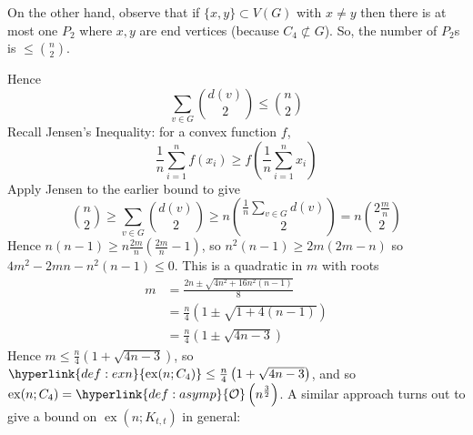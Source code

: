 \documentclass{article}
\DeclareMathOperator{\ext}{ex}
\begin{document}
\begin{eg}
    On the other hand, observe that if $\{x, y\} \subset V(G)$ with $x \neq y$ then there is at most one $P_2$ where $x, y$ are end vertices (because $C_4 \not\subset G$). So, the number of $P_2$s is $\leq \binom{n}{2}$.
    \begin{center}
    \end{center}
    Hence \begin{equation*}\sum_{v \in G} \binom{d(v)}{2} \leq \binom{n}{2}\end{equation*}
    Recall Jensen's Inequality: for a convex function $f$,
    \begin{equation*}
        \frac{1}{n} \sum_{i=1}^n f(x_i) \geq f\left(\frac{1}{n} \sum_{i=1}^n x_i\right)
    \end{equation*}
    Apply Jensen to the earlier bound to give
    \begin{equation*}
        \binom{n}{2} \geq \sum_{v \in G} \binom{d(v)}{2} \geq n \binom{\frac{1}{n} \sum_{v \in G} d(v)}{2} = n \binom{2 \frac{m}{n}}{2}
    \end{equation*}
    Hence $n(n-1) \geq n \frac{2m}{n} (\frac{2m}{n} - 1)$, so $n^2 (n-1) \geq 2m (2m-n)$ so $4m^2 - 2mn - n^2 (n-1) \leq 0$.
    This is a quadratic in $m$ with roots
    \begin{align*}
        m &= \frac{2n \pm \sqrt{4 n^2 + 16 n^2(n-1)}}{8} \\
        &= \frac{n}{4}(1 \pm \sqrt{1 + 4\left(n-1\right)}) \\
        &= \frac{n}{4}\left(1 \pm \sqrt{4n - 3}\right)
    \end{align*}
    Hence $m \leq \frac{n}{4}\left(1 + \sqrt{4n-3}\right)$, so $\hyperlink{def:exn}{\ext(n; C_4)} \leq \frac{n}{4} \left(1 + \sqrt{4n-3}\right)$, and so $\ext(n; C_4) = \hyperlink{def:asymp}{\mathcal{O}}\left(n^\frac{3}{2}\right)$.
    A similar approach turns out to give a bound on $\ext(n; K_{t, t})$ in general:
    \begin{center}
\end{center}
\end{eg}
\end{document}
